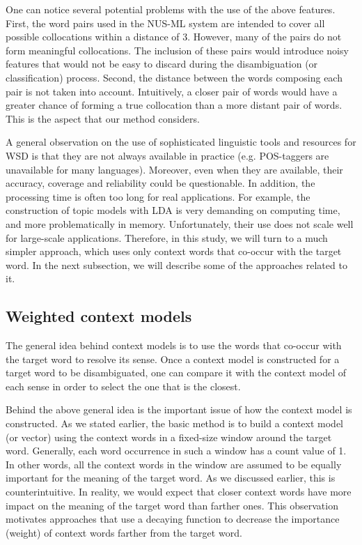 \documentclass[english]{jnlp_1.4}
\begin{document}
One can notice several potential problems with the use of the above
features. First, the word pairs used in the NUS-ML system are intended
to cover all possible collocations within a distance of 3. However,
many of the pairs do not form meaningful collocations. The inclusion
of these pairs would introduce noisy features that would not be easy
to discard during the disambiguation (or classification) process.
Second, the distance between the words composing each pair is not
taken into account. Intuitively, a closer pair of words would have
a greater chance of forming a true collocation than a more distant
pair of words. This is the aspect that our method considers.

A general observation on the use of sophisticated linguistic tools
and resources for WSD is that they are not always available in practice
(e.g. POS-taggers are unavailable for many languages). Moreover, even
when they are available, their accuracy, coverage and reliability
could be questionable. In addition, the processing time is often too
long for real applications. For example, the construction of topic
models with LDA is very demanding on computing time, and more problematically
in memory. Unfortunately, their use does not scale well for large-scale
applications. Therefore, in this study, we will turn to a much simpler
approach, which uses only context words that co-occur with the target
word. In the next subsection, we will describe some of the approaches
related to it.


\subsection{Weighted context models}
\label{sec:Context-models}

The general idea behind context models is to use the words that co-occur
with the target word to resolve its sense. Once a context model is
constructed for a target word to be disambiguated, one can compare
it with the context model of each sense in order to select the one
that is the closest.

Behind the above general idea is the important issue of how the context
model is constructed. As we stated earlier, the basic method is to
build a context model (or vector) using the context words in a fixed-size
window around the target word. Generally, each word occurrence in
such a window has a count value of 1. In other words, all the context
words in the window are assumed to be equally important for the meaning
of the target word. As we discussed earlier, this is counterintuitive.
In reality, we would expect that closer context words have more impact
on the meaning of the target word than farther ones. This observation
motivates approaches that use a decaying function to decrease the
importance (weight) of context words farther from the target word.
\end{document}
